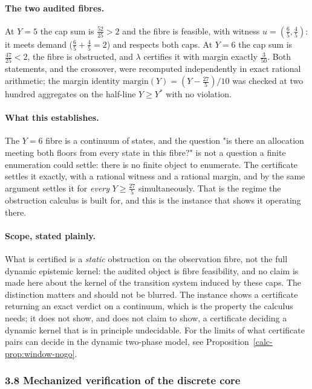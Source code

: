 \documentclass[10pt,twocolumn]{article}
\theoremstyle{definition}
\begin{document}
\paragraph{The two audited fibres.} At \(Y=5\) the cap sum is \(\tfrac{52}{25}>2\) and the
fibre is feasible, with witness \(u=(\tfrac65,\tfrac45)\): it meets demand
(\(\tfrac65+\tfrac45=2\)) and respects both caps. At \(Y=6\) the cap sum is
\(\tfrac{47}{25}<2\), the fibre is obstructed, and \(\lambda\) certifies it with margin
exactly \(\tfrac{3}{50}\). Both statements, and the crossover, were recomputed independently
in exact rational arithmetic; the margin identity
\(\mathrm{margin}(Y)=(Y-\tfrac{27}{5})/10\) was checked at two hundred aggregates on the
half-line \(Y\ge Y^{*}\) with no violation.

\paragraph{What this establishes.} The \(Y=6\) fibre is a continuum of states, and the
question "is there an allocation meeting both floors from every state in this fibre?" is not
a question a finite enumeration could settle: there is no finite object to enumerate. The
certificate settles it exactly, with a rational witness and a rational margin, and by the
same argument settles it for \emph{every} \(Y\ge\tfrac{27}{5}\) simultaneously. That is the
regime the obstruction calculus is built for, and this is the instance that shows it
operating there.

\paragraph{Scope, stated plainly.} What is certified is a \emph{static} obstruction on the
observation fibre, not the full dynamic epistemic kernel: the audited object is fibre
feasibility, and no claim is made here about the kernel of the transition system induced by
these caps. The distinction matters and should not be blurred. The instance shows a
certificate returning an exact verdict on a continuum, which is the property the calculus
needs; it does not show, and does not claim to show, a certificate deciding a dynamic kernel
that is in principle undecidable. For the limits of what certificate pairs can decide in the
dynamic two-phase model, see Proposition~\ref{calc-prop:window-nogo}.

\subsubsection{3.8 Mechanized verification of the discrete core}
\label{calc-mech}
\end{document}

